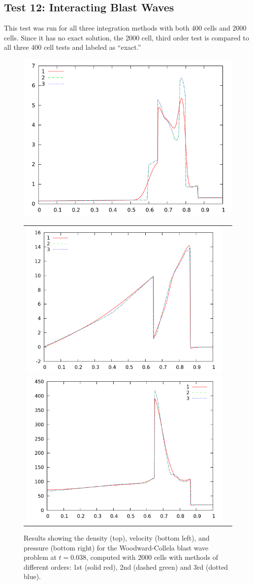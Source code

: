 \documentclass[10pt]{article}
\begin{document}
\subsection{Test 12: Interacting Blast Waves}
This test was run for all three integration methods with both 400 cells and 2000 cells. Since it has no exact solution, the 2000 cell, third order test is compared to all three 400 cell tests and labeled as ``exact.''

\begin{figure}[h]
  \begin{center}
     \includegraphics[width=.95\textwidth]{den_T12_2000.png}
	\begin{tabular}{cc}
     \includegraphics[width=.475\textwidth]{vel_T12_2000.png}
     \includegraphics[width=.475\textwidth]{prs_T12_2000.png}	
    \end{tabular}	
  \end{center}
  \caption{Results showing the density (top), velocity (bottom left), and pressure (bottom right) for the Woodward-Collela blast wave problem at $t=0.038$, computed with 2000 cells with methods of different orders: 1st (solid red), 2nd (dashed green) and 3rd (dotted blue).}
  \label{fig:den_T12_2000}
\end{figure}
\end{document}
